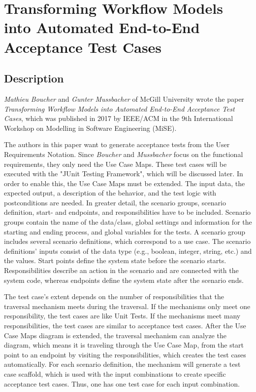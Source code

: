 \section{Transforming Workflow Models into Automated End-to-End Acceptance Test Cases\cite{BoucherMussbacher2017}}

\subsection{Description}

\textit{Mathieu Boucher} and \textit{Gunter Mussbacher} of McGill University wrote the paper \textit{Transforming Workflow Models into Automated End-to-End Acceptance Test Cases}, which was published in 2017 by IEEE/ACM in the 9th International Workshop on Modelling in Software Engineering (MiSE).

The authors in this paper want to generate acceptance tests from the User Requirements Notation. Since \textit{Boucher} and \textit{Mussbacher} focus on the functional requirements, they only need the Use Case Maps. These test cases will be executed with the "JUnit Testing Framework", which will be discussed later. In order to enable this, the Use Case Maps must be extended. The input data, the expected output, a description of the behavior, and the test logic with postconditions are needed. In greater detail, the scenario groups, scenario definition, start- and endpoints, and responsibilities have to be included. Scenario groups contain the name of the data/class, global settings and information for the starting and ending process, and global variables for the tests. A scenario group includes several scenario definitions, which correspond to a use case. The scenario definitions' inputs consist of the data type (e.g., boolean, integer, string, etc.) and the values. Start points define the system state before the scenario starts. Responsibilities describe an action in the scenario and are connected with the system code, whereas endpoints define the system state after the scenario ends. 

The test case's extent depends on the number of responsibilities that the traversal mechanism meets during the traversal. If the mechanisms only meet one responsibility, the test cases are like Unit Tests. If the mechanisms meet many responsibilities, the test cases are similar to acceptance test cases. After the Use Case Maps diagram is extended, the traversal mechanism can analyze the diagram, which means it is traveling through the Use Case Map, from the start point to an endpoint by visiting the responsibilities, which creates the test cases automatically. For each scenario definition, the mechanism will generate a test case scaffold, which is used with the input combinations to create specific acceptance test cases. Thus, one has one test case for each input combination. 

